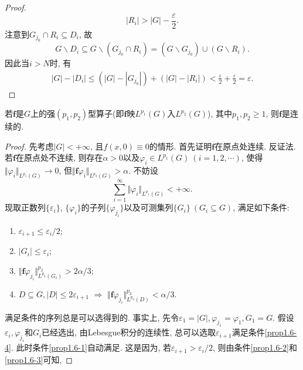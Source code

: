 \begin{lemma}
\begin{proof}
\begin{equation*}
            |R_i| > |G| - \frac{\varepsilon}{2}.
        \end{equation*}
        注意到$G_{j_0} \cap R_i \subseteq D_i$, 故 
        \begin{equation*}
            G \smallsetminus D_i \subseteq G \smallsetminus (G_{j_0} \cap R_i) = (G \smallsetminus G_{j_0}) \cup (G \smallsetminus R_i).
        \end{equation*}
        因此当$i > N$时, 有 
        \begin{align*}
            |G| - |D_i| \leq (|G| - |G_{j_0}|) + (|G| - |R_i|) < \frac{\varepsilon}{2} + \frac{\varepsilon}{2} = \varepsilon.
        \end{align*}
    \end{proof}
\end{lemma}

\begin{proposition}\label{prop1.6}
    若$\bm{f}$是$G$上的强$(p_1, p_2)$型算子(即$\bm{f}$映$L^{p_1}(G)$入$L^{p_2}(G)$), 其中$p_1, p_2 \geq 1$, 则$\bm{f}$是连续的.
    \begin{proof}
        先考虑$|G| < +\infty$, 且$f(x, 0) \equiv 0$的情形. 首先证明$\bm{f}$在原点处连续. 反证法. 若$\bm{f}$在原点处不连续, 则存在$\alpha > 0$以及$\varphi_i \in L^{p_1}(G)\ (i = 1, 2, \cdots)$, 使得$\Vert \varphi_i\Vert_{L^{p_1}(G)} \rightarrow 0$, 但$\Vert \bm{f}\varphi_i\Vert_{L^{p_2}(G)} > \alpha$. 不妨设 
        \begin{equation}\label{1}
            \sum_{i = 1}^{\infty}\Vert \varphi_i\Vert_{L^{p_1}(G)} < +\infty.
        \end{equation}
        现取正数列$\{\varepsilon_i\}$, $\{\varphi_i\}$的子列$\{\varphi_{j_i}\}$以及可测集列$\{G_i\}\ (G_i \subseteq G)$, 满足如下条件:
        \begin{enumerate}
            \item $\varepsilon_{i + 1} \leq \varepsilon_i/2$; \label{prop1.6-1}
            \item $|G_i| \leq \varepsilon_i$; \label{prop1.6-2}
            \item $\Vert \bm{f}\varphi_{j_i}\Vert_{L^{p_2}(G_i)}^{p_2} > 2\alpha/3$; \label{prop1.6-3}
            \item $D \subseteq G, |D| \leq 2\varepsilon_{i + 1}$ $\Longrightarrow$ $\Vert \bm{f}\varphi_{j_i}\Vert_{L^{p_2}(D)}^{p_2} < \alpha/3$. \label{prop1.6-4}
        \end{enumerate}
        满足条件的序列总是可以选得到的. 事实上, 先令$\varepsilon_1 = |G|, \varphi_{j_1} = \varphi_1, G_1 = G$. 假设$\varepsilon_i, \varphi_{j_i}$和$G_i$已经选出, 由Lebesgue积分的连续性, 总可以选取$\varepsilon_{i + 1}$满足条件\ref{prop1.6-4}. 此时条件\ref{prop1.6-1}自动满足. 这是因为, 若$\varepsilon_{i + 1} > \varepsilon_i/2$, 则由条件\ref{prop1.6-2}和\ref{prop1.6-3}可知, 

\end{proof}
\end{proposition}
